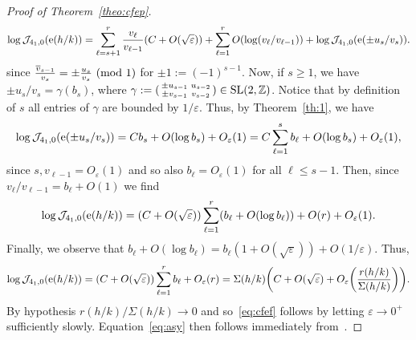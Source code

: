 \documentclass[11pt]{amsart}
\newcommand{\eps}{\varepsilon}
\newcommand{\Z}{\mathbb{Z}}
\newcommand{\Sm}{\Sigma}
\newcommand{\J}{\mathcal{J}}
\newcommand{\tn}[1]{\textnormal{#1}}
\renewcommand{\mod}[1]{~\pr{\textnormal{mod}~#1}}
\theoremstyle{definition}
\newcommand{\pr}[1]{\mathchoice{\left( #1\right)}{(#1)}{(#1)}{(#1)}}
\newcommand{\e}[1][]{\ifthenelse{\equal{#1}{}}{{\rm e}}{\operatorname{e}\pr{ #1}}}
\newcommand{\1}{{\mathbf 1}}
\newcommand{\SL}{\tn{SL}}
\let\originalleft\left
\let\originalright\right
\renewcommand{\left}{\mathopen{}\mathclose\bgroup\originalleft}
\renewcommand{\right}{\aftergroup\egroup\originalright}
\numberwithin{equation}{section}
\begin{document}
\begin{proof}[Proof of Theorem~\ref{theo:cfep}]
  \begin{align*}
    \log \J_{4_1,0}(\e[ { h}/k])= \sum_{\ell=s+1}^{r}\frac{v_{\ell}}{v_{\ell-1}}(C+O(\sqrt{\eps}))+\sum_{\ell=1}^{r} O(\log(v_{\ell}/v_{\ell-1}))+    \log \J_{4_1,0}(\e[\pm{ u_{s}}/v_{s}]).
  \end{align*}
  since $\tfrac{\overline v_{s-1} }{v_{s}}=\pm\tfrac{u_{s} }{v_{s}}\mod 1$ for $\pm1:=(-1)^{s-1} $. Now, if $s\geq1$, we have $\pm u_s/v_s=\gamma (b_s)$, where 
  $\gamma:=(\begin{smallmatrix}\pm u_{s-1} & u_{s-2}\\ \pm v_{s-1} & v_{s-2}\end{smallmatrix})\in\SL(2,\Z)$. Notice that by definition of $s$ all entries of $\gamma$ are bounded by $1/\eps$.
  Thus, by Theorem~\ref{th:1}, we have
  \begin{align*}
    \log \J_{4_1,0}(\e[\pm{ u_{s}}/v_{s}]) = Cb_s+O(\log b_s)+O_\eps(1)=C\sum_{\ell=1}^s b_\ell+O(\log b_s)+O_\eps(1),
  \end{align*}
  since $s,v_{\ell-1}=O_\eps(1)$ and so also $b_\ell=O_{\eps}(1)$ for all $\ell\leq s-1$. Then, since $v_{\ell}/v_{\ell-1}=b_\ell+O(1)$ we find
  \begin{align*}
    \log \J_{4_1,0}(\e[ { h}/k])=(C+O(\sqrt\eps)) \sum_{\ell=1}^{r}(b_\ell+ O(\log b_\ell))+O(r)+O_\eps(1).
  \end{align*}
  Finally, we observe that $b_\ell+ O(\log b_\ell)=b_\ell(1+O(\sqrt\eps))+O(1/\eps)$. Thus,
  \begin{align*}
    \log \J_{4_1,0}(\e[ { h}/k])=(C+O(\sqrt\eps)) \sum_{\ell=1}^{r}b_\ell+O_\eps(r)= \Sm(h/k) \bigg(C +O(\sqrt\eps)+O_\eps\bigg(\frac{r(h/k)}{\Sm(h/k)}\bigg)\bigg).
  \end{align*}
  By hypothesis $r(h/k)/\Sm(h/k)\to0$ and so~\eqref{eq:cfef} follows by letting $\eps\to0^+$ sufficiently slowly.
Equation~\eqref{eq:asy} then follows immediately from~\cite[Corollary~1.4]{BettinDrappeau}.
\end{proof}
\end{document}
